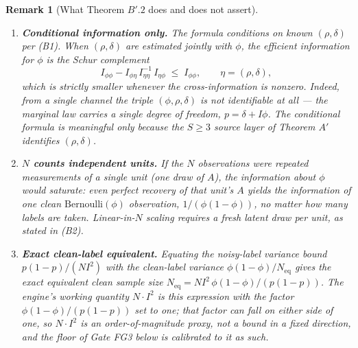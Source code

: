 \documentclass[11pt,a4paper]{article}
\newtheorem{remark}{Remark}
\begin{document}
\begin{remark}[What Theorem $B'.2$ does and does not assert]
\begin{enumerate}
    \item \textbf{Conditional information only.} The formula conditions on known $(\rho, \delta)$ per (B1). When $(\rho, \delta)$ are estimated jointly with $\phi$, the efficient information for $\phi$ is the Schur complement
\[
I_{\phi\phi} - I_{\phi\eta}\, I_{\eta\eta}^{-1}\, I_{\eta\phi} \;\le\; I_{\phi\phi}, \qquad \eta = (\rho, \delta), %
\]
which is strictly smaller whenever the cross-information is nonzero. Indeed, from a \emph{single} channel the triple $(\phi, \rho, \delta)$ is not identifiable at all --- the marginal law carries a single degree of freedom, $p = \delta + I\phi$. The conditional formula is meaningful only because the $S \ge 3$ source layer of Theorem $A'$ identifies $(\rho, \delta)$. %
    \item \textbf{$N$ counts independent units.} If the $N$ observations were repeated measurements of a \emph{single} unit (one draw of $A$), the information about $\phi$ would saturate: even perfect recovery of that unit's $A$ yields the information of one clean $\mathrm{Bernoulli}(\phi)$ observation, $1/(\phi(1-\phi))$, no matter how many labels are taken. Linear-in-$N$ scaling requires a fresh latent draw per unit, as stated in (B2). %
    \item \textbf{Exact clean-label equivalent.} Equating the noisy-label variance bound $p(1-p)/(N I^2)$ with the clean-label variance $\phi(1-\phi)/N_{\mathrm{eq}}$ gives the exact equivalent clean sample size $N_{\mathrm{eq}} = N I^2\, \phi(1-\phi)/(p(1-p))$. The engine's working quantity $N \cdot I^2$ is this expression with the factor $\phi(1-\phi)/(p(1-p))$ set to one; that factor can fall on either side of one, so $N \cdot I^2$ is an order-of-magnitude proxy, not a bound in a fixed direction, and the floor of Gate FG3 below is calibrated to it as such. %
\end{enumerate}
\end{remark}
\end{document}
